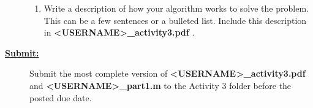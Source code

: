 \documentclass[12pt]{article}
\newcommand{\ANUM}{3} %
\begin{document}
\begin{description}
\begin{enumerate}
	\item Write a description of how your algorithm works to solve the problem. This can be a few sentences or a bulleted list. Include this description in {\bf \BL<USERNAME>\BK\_activity\ANUM.pdf }.
	
	
\end{enumerate}

\item[\textbf{\underline{Submit:}}] \hfill \vspace{0mm}

		Submit the most complete version of {\bf \BL<USERNAME>\BK\_activity\ANUM.pdf} \\and {\bf \BL<USERNAME>\BK\_part1.m } to the Activity \ANUM \hspace{1mm} folder before the posted due date.

\end{description}
\end{document}
